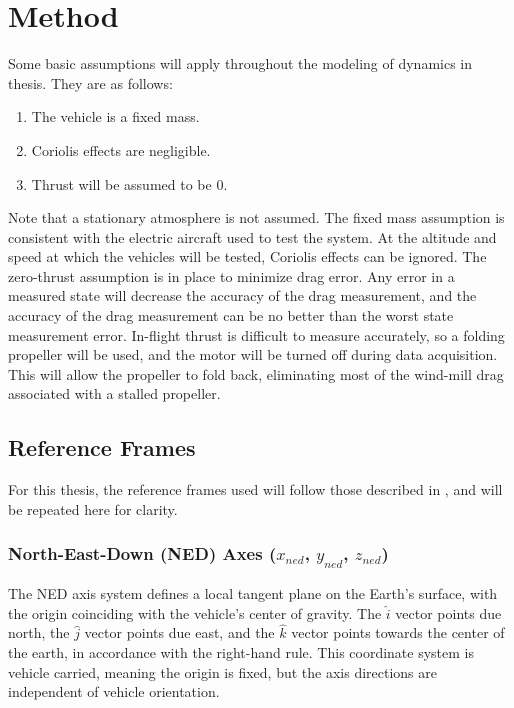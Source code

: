 \chapter{Method}

\label{background-information}
Some basic assumptions will apply throughout the modeling of dynamics in thesis. They are as follows:
\begin{enumerate}
\item The vehicle is a fixed mass.
\item Coriolis effects are negligible.
\item Thrust will be assumed to be 0.
\end{enumerate}
Note that a stationary atmosphere is not assumed. The fixed mass assumption is consistent with the electric aircraft used to test the system. At the altitude and speed at which the vehicles will be tested, Coriolis effects can be ignored\cite{klein2006aircraft}. The zero-thrust assumption is in place to minimize drag error. Any error in a measured state will decrease the accuracy of the drag measurement, and the accuracy of the drag measurement can be no better than the worst state measurement error. In-flight thrust is difficult to measure accurately, so a folding propeller will be used, and the motor will be turned off during data acquisition. This will allow the propeller to fold back, eliminating most of the wind-mill drag associated with a stalled propeller. 

\section{Reference Frames}
For this thesis, the reference frames used will follow those described in \cite{klein2006aircraft}, and will be repeated here for clarity.
\subsection*{North-East-Down (NED) Axes ($x_{ned}$, $y_{ned}$, $z_{ned}$)}
The NED axis system defines a local tangent plane on the Earth's surface, with the origin coinciding with the vehicle's center of gravity. The $\hat{i}$ vector points due north, the $\hat{j}$ vector points due east, and the $\hat{k}$ vector points towards the center of the earth, in accordance with the right-hand rule. This coordinate system is vehicle carried, meaning the origin is fixed, but the axis directions are independent of vehicle orientation.

